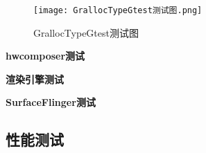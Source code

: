 \begin{figure}[h]
    \centering
    \texttt{[image: GrallocTypeGtest测试图.png]}
    \caption{GrallocTypeGtest测试图}
    \label{fig:GrallocTypeGtest测试图}
\end{figure}

\textbf{hwcomposer测试}

\textbf{渲染引擎测试}

\textbf{SurfaceFlinger测试}



\subsection{性能测试}









